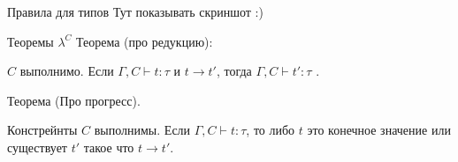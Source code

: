 \documentclass[10pt, mathserif]{beamer}
\theoremstyle{definition}
\begin{document}
\begin{frame}[fragile]{Правила для типов}
Тут показывать скриншот :)










\end{frame}


\begin{frame}[fragile]{Теоремы $\lambda^C$}
Теорема (про редукцию):

$C$ выполнимо. Если $\Gamma,C \vdash t:\tau$ и $t\to t'$, тогда
$\Gamma, C \vdash t':\tau$ .

\vspace{1cm}

Теорема (Про прогресс).

Констрейнты $C$ выполнимы. Если $\Gamma,C \vdash t:\tau$, то либо $t$ это 
конечное значение или существует $t'$ такое что $t \to t'$.
\end{frame}
\end{document}
